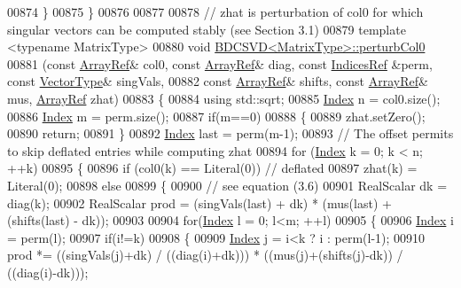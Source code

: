 \begin{DoxyCode}
00874   \}
00875 \}
00876 
00877 
00878 \textcolor{comment}{// zhat is perturbation of col0 for which singular vectors can be computed stably (see Section 3.1)}
00879 \textcolor{keyword}{template} <\textcolor{keyword}{typename} MatrixType>
00880 \textcolor{keywordtype}{void} \hyperlink{group___s_v_d___module_class_eigen_1_1_b_d_c_s_v_d}{BDCSVD<MatrixType>::perturbCol0}
00881    (\textcolor{keyword}{const} \hyperlink{group___core___module_class_eigen_1_1_ref}{ArrayRef}& col0, \textcolor{keyword}{const} \hyperlink{group___core___module_class_eigen_1_1_ref}{ArrayRef}& diag, \textcolor{keyword}{const} \hyperlink{group___core___module_class_eigen_1_1_ref}{IndicesRef} &perm, \textcolor{keyword}{const} 
      \hyperlink{group___core___module}{VectorType}& singVals,
00882     \textcolor{keyword}{const} \hyperlink{group___core___module_class_eigen_1_1_ref}{ArrayRef}& shifts, \textcolor{keyword}{const} \hyperlink{group___core___module_class_eigen_1_1_ref}{ArrayRef}& mus, \hyperlink{group___core___module_class_eigen_1_1_ref}{ArrayRef} zhat)
00883 \{
00884   \textcolor{keyword}{using} std::sqrt;
00885   \hyperlink{namespace_eigen_a62e77e0933482dafde8fe197d9a2cfde}{Index} n = col0.size();
00886   \hyperlink{namespace_eigen_a62e77e0933482dafde8fe197d9a2cfde}{Index} m = perm.size();
00887   \textcolor{keywordflow}{if}(m==0)
00888   \{
00889     zhat.setZero();
00890     \textcolor{keywordflow}{return};
00891   \}
00892   \hyperlink{namespace_eigen_a62e77e0933482dafde8fe197d9a2cfde}{Index} last = perm(m-1);
00893   \textcolor{comment}{// The offset permits to skip deflated entries while computing zhat}
00894   \textcolor{keywordflow}{for} (\hyperlink{namespace_eigen_a62e77e0933482dafde8fe197d9a2cfde}{Index} k = 0; k < n; ++k)
00895   \{
00896     \textcolor{keywordflow}{if} (col0(k) == Literal(0)) \textcolor{comment}{// deflated}
00897       zhat(k) = Literal(0);
00898     \textcolor{keywordflow}{else}
00899     \{
00900       \textcolor{comment}{// see equation (3.6)}
00901       RealScalar dk = diag(k);
00902       RealScalar prod = (singVals(last) + dk) * (mus(last) + (shifts(last) - dk));
00903 
00904       \textcolor{keywordflow}{for}(\hyperlink{namespace_eigen_a62e77e0933482dafde8fe197d9a2cfde}{Index} l = 0; l<m; ++l)
00905       \{
00906         \hyperlink{namespace_eigen_a62e77e0933482dafde8fe197d9a2cfde}{Index} i = perm(l);
00907         \textcolor{keywordflow}{if}(i!=k)
00908         \{
00909           \hyperlink{namespace_eigen_a62e77e0933482dafde8fe197d9a2cfde}{Index} j = i<k ? i : perm(l-1);
00910           prod *= ((singVals(j)+dk) / ((diag(i)+dk))) * ((mus(j)+(shifts(j)-dk)) / ((diag(i)-dk)));

\end{DoxyCode}
